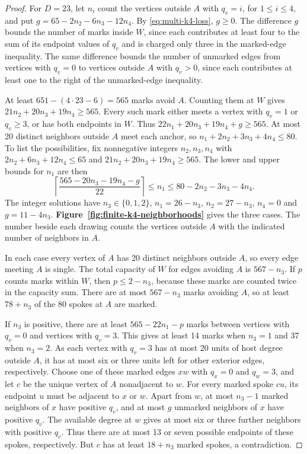 \begin{proof}
For $D=23$, let $n_i$ count the vertices outside $A$
with $q_v=i$, for $1\le i\le4$, and put
$g=65-2n_2-6n_3-12n_4$. By \eqref{eq:multi-k4-loss},
$g\ge0$. The difference $g$ bounds the number of marks
inside $W$, since each contributes at least four to the
sum of its endpoint values of $q_v$ and is charged only
three in the marked-edge inequality. The same difference
bounds the number of unmarked edges from vertices with
$q_v=0$ to vertices outside $A$ with $q_v>0$, since each
contributes at least one to the right of the unmarked-edge
inequality.

At least $651-(4\cdot23-6)=565$ marks avoid $A$.
Counting them at $W$ gives $21n_2+20n_3+19n_4\ge565$.
Every such mark either meets a vertex with $q_v=1$ or
$q_v\ge3$, or has both endpoints in $W$. Thus
$22n_1+20n_3+19n_4+g\ge565$. At most 20 distinct
neighbors outside $A$ meet each anchor, so
$n_1+2n_2+3n_3+4n_4\le80$. To list the possibilities, fix
nonnegative integers $n_2,n_3,n_4$ with $2n_2+6n_3+12n_4\le65$
and $21n_2+20n_3+19n_4\ge565$. The lower and upper bounds for
$n_1$ are then
\[
 \left\lceil\frac{565-20n_3-19n_4-g}{22}\right\rceil
 \le n_1\le80-2n_2-3n_3-4n_4 .
\]
The integer solutions have $n_3\in\{0,1,2\}$,
$n_1=26-n_3$, $n_2=27-n_3$, $n_4=0$ and $g=11-4n_3$.
\textbf{Figure~\ref{fig:finite-k4-neighborhoods}} gives the three cases.
The number beside each drawing counts the vertices outside $A$ with
the indicated number of neighbors in $A$.

In each case every vertex of $A$ has 20 distinct neighbors outside
$A$, so every edge meeting $A$ is single.
The total capacity of $W$ for edges avoiding $A$ is
$567-n_3$. If $p$ counts marks within $W$, then
$p\le2-n_3$, because these marks are counted twice in
the capacity sum. There are at most $567-n_3$ marks
avoiding $A$, so at least $78+n_3$ of the 80 spokes at
$A$ are marked.

If $n_3$ is positive, there are at least $565-22n_1-p$
marks between vertices with $q_v=0$ and vertices with
$q_v=3$. This gives at least 14 marks when $n_3=1$ and
37 when $n_3=2$. As each vertex with $q_v=3$ has at
most 20 units of host degree outside $A$, it has at
most six or three units left for other exterior edges,
respectively. Choose one of these marked edges $xw$
with $q_x=0$ and $q_w=3$, and let $c$ be the unique vertex of
$A$ nonadjacent to $w$. For every marked spoke $cu$, its endpoint
$u$ must be adjacent to $x$ or $w$. Apart from $w$,
at most $n_3-1$ marked neighbors of $x$ have positive
$q_v$, and at most $g$ unmarked neighbors of $x$ have
positive $q_v$. The available degree at $w$ gives at
most six or three further neighbors with positive $q_v$.
Thus there are at most 13 or seven possible endpoints
of these spokes, respectively. But $c$ has at least
$18+n_3$ marked spokes, a contradiction.


\end{proof}
